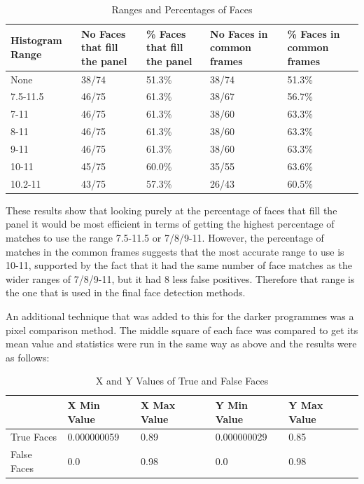 \begin{table}[ht]
\begin{tabular}{|p{50pt} | p{80pt} | p{80pt} | p{80pt} | p{80pt} | }
\hline
Histogram Range & No Faces that fill the panel & \% Faces that fill the panel & No Faces in common frames & \% Faces in common frames \\\hline
None	&38/74	&51.3\%	&38/74	&51.3\% \\\hline
7.5-11.5	&46/75	&61.3\%	&38/67	&56.7\% \\\hline
7-11	&46/75	&61.3\%	&38/60	&63.3\% \\\hline
8-11	&46/75	&61.3\%	&38/60	&63.3\% \\\hline
9-11	&46/75	&61.3\%	&38/60	&63.3\% \\\hline
10-11	&45/75	&60.0\%	&35/55	&63.6\% \\\hline
10.2-11	&43/75	&57.3\%	&26/43	&60.5\% \\\hline
\end{tabular}
\caption{Ranges and Percentages of Faces}
\end{table}
\label{tab:RangesAndPercentages} 

These results show that looking purely at the percentage of faces that fill the panel it would be most efficient in terms of getting the highest 
percentage of matches to use the range 7.5-11.5 or 7/8/9-11. However, the percentage of matches in the common frames suggests that the most 
accurate range to use is 10-11, supported by the fact that it had the same number of face matches as the wider ranges of 7/8/9-11, but it had 8 less false positives. Therefore that range is the one that is used in the final face detection methods.

An additional technique that was added to this for the darker programmes was a pixel comparison method. The middle square of each face was compared to get its mean value and statistics were run in the same way as above and the results were as follows: 

\begin{center}
\begin{table}[ht]
\begin{tabular}{|p{70pt} | p{75pt} | p{75pt} | p{75pt} | p{75pt} | }
	\hline
	& X Min Value & X Max Value & Y Min Value & Y Max Value \\\hline
	True Faces & 0.000000059 & 0.89 & 0.000000029 & 0.85 \\\hline
	False Faces & 0.0 & 0.98 & 0.0 & 0.98 \\\hline
\end{tabular}
\caption{X and Y Values of True and False Faces}
\end{table}
\label{tab:TrueFalseValues} 
\end{center}

